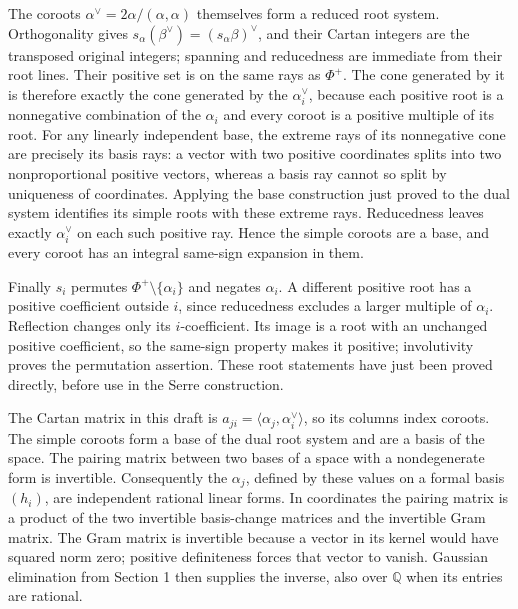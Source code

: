 \documentclass[11pt,a4paper,openany]{report}
\begin{document}
The coroots \(\alpha^\vee=2\alpha/(\alpha,\alpha)\) themselves form a reduced root system. Orthogonality gives \(s_\alpha(\beta^\vee)=(s_\alpha\beta)^\vee\), and their Cartan integers are the transposed original integers; spanning and reducedness are immediate from their root lines. Their positive set is on the same rays as \(\Phi^+\). The cone generated by it is therefore exactly the cone generated by the \(\alpha_i^\vee\), because each positive root is a nonnegative combination of the \(\alpha_i\) and every coroot is a positive multiple of its root. For any linearly independent base, the extreme rays of its nonnegative cone are precisely its basis rays: a vector with two positive coordinates splits into two nonproportional positive vectors, whereas a basis ray cannot so split by uniqueness of coordinates. Applying the base construction just proved to the dual system identifies its simple roots with these extreme rays. Reducedness leaves exactly \(\alpha_i^\vee\) on each such positive ray. Hence the simple coroots are a base, and every coroot has an integral same-sign expansion in them.

Finally \(s_i\) permutes \(\Phi^+\setminus\{\alpha_i\}\) and negates \(\alpha_i\). A different positive root has a positive coefficient outside \(i\), since reducedness excludes a larger multiple of \(\alpha_i\). Reflection changes only its \(i\)-coefficient. Its image is a root with an unchanged positive coefficient, so the same-sign property makes it positive; involutivity proves the permutation assertion. These root statements have just been proved directly, before use in the Serre construction.

The Cartan matrix in this draft is \(a_{ji}=\langle\alpha_j,\alpha_i^\vee\rangle\), so its columns index coroots. The simple coroots form a base of the dual root system and are a basis of the space. The pairing matrix between two bases of a space with a nondegenerate form is invertible. Consequently the \(\alpha_j\), defined by these values on a formal basis \((h_i)\), are independent rational linear forms. In coordinates the pairing matrix is a product of the two invertible basis-change matrices and the invertible Gram matrix. The Gram matrix is invertible because a vector in its kernel would have squared norm zero; positive definiteness forces that vector to vanish. Gaussian elimination from Section 1 then supplies the inverse, also over \(\mathbb Q\) when its entries are rational.
\end{document}
